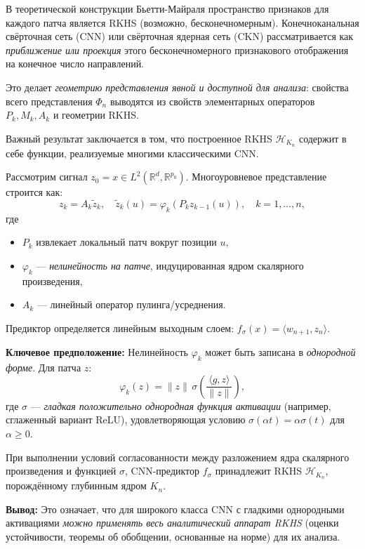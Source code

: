 \documentclass[../NDCNNAI_main.tex]{subfiles}
\begin{document}
В теоретической конструкции Бьетти-Майраля \cite{Bietti_Group} пространство признаков для каждого патча является RKHS (возможно, бесконечномерным). Конечноканальная свёрточная сеть (CNN) или свёрточная ядерная сеть (CKN) рассматривается как \emph{приближение или проекция} этого бесконечномерного признакового отображения на конечное число направлений.

Это делает \emph{геометрию представления явной и доступной для анализа}: свойства всего представления \(\Phi_n\) выводятся из свойств элементарных операторов \(P_k, M_k, A_k\) и геометрии RKHS.

Важный результат \cite{Bietti_Group} заключается в том, что построенное RKHS \(\mathcal{H}_{K_n}\) содержит в себе функции, реализуемые многими классическими CNN.
\begin{definition}
Рассмотрим сигнал \(z_0 = x \in L^2(\mathbb{R}^d, \mathbb{R}^{p_0})\). Многоуровневое представление строится как:
\[
z_k = A_k \tilde{z}_k, \quad \tilde{z}_k(u) = \varphi_k(P_k z_{k-1}(u)), \quad k = 1, \ldots, n,
\]
где
\begin{itemize}
    \item \(P_k\) извлекает локальный патч вокруг позиции \(u\),
    \item \(\varphi_k\) --- \emph{нелинейность на патче}, индуцированная ядром скалярного произведения,
    \item \(A_k\) --- линейный оператор пулинга/усреднения.
\end{itemize}
Предиктор определяется линейным выходным слоем: \(f_\sigma(x) = \langle w_{n+1}, z_n \rangle\).
\end{definition}

\textbf{Ключевое предположение:} Нелинейность \(\varphi_k\) может быть записана в \emph{однородной форме}. Для патча \(z\):
\[
\varphi_k(z) = \|z\| \, \sigma\left( \frac{\langle g, z \rangle}{\|z\|} \right),
\]
где \(\sigma\) --- \emph{гладкая положительно однородная функция активации} (например, сглаженный вариант ReLU), удовлетворяющая условию \(\sigma(\alpha t) = \alpha \sigma(t)\) для \(\alpha \geq 0\).

\begin{theorem}
При выполнении условий согласованности между разложением ядра скалярного произведения и функцией \(\sigma\), CNN-предиктор \(f_\sigma\) принадлежит RKHS \(\mathcal{H}_{K_n}\), порождённому глубинным ядром \(K_n\).
\end{theorem}
\textbf{Вывод:} Это означает, что для широкого класса CNN с гладкими однородными активациями \emph{можно применять весь аналитический аппарат RKHS} (оценки устойчивости, теоремы об обобщении, основанные на норме) для их анализа.
\end{document}
